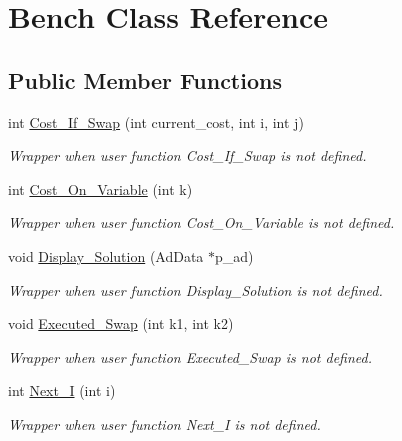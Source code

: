 \hypertarget{classBench}{
\section{Bench Class Reference}
\label{classBench}
}
\subsection*{Public Member Functions}
\begin{DoxyCompactItemize}
\item 
int \hyperlink{classBench_a1dfbb29be43f39a902e8f34a89517999}{Cost\_\-If\_\-Swap} (int current\_\-cost, int i, int j)
\begin{DoxyCompactList}\small\item\em Wrapper when user function Cost\_\-If\_\-Swap is not defined. \item\end{DoxyCompactList}\item 
int \hyperlink{classBench_a822adf748744efa9cf61fdabbce0c02e}{Cost\_\-On\_\-Variable} (int k)
\begin{DoxyCompactList}\small\item\em Wrapper when user function Cost\_\-On\_\-Variable is not defined. \item\end{DoxyCompactList}\item 
void \hyperlink{classBench_aac07a34ac847eb72ed63356853b6fab5}{Display\_\-Solution} (AdData $\ast$p\_\-ad)
\begin{DoxyCompactList}\small\item\em Wrapper when user function Display\_\-Solution is not defined. \item\end{DoxyCompactList}\item 
void \hyperlink{classBench_acfc053cfc8dcad607a543b0c932cec35}{Executed\_\-Swap} (int k1, int k2)
\begin{DoxyCompactList}\small\item\em Wrapper when user function Executed\_\-Swap is not defined. \item\end{DoxyCompactList}\item 
int \hyperlink{classBench_a5d554fbfc64b616467aab8d6d2680ee7}{Next\_\-I} (int i)
\begin{DoxyCompactList}\small\item\em Wrapper when user function Next\_\-I is not defined. \item\end{DoxyCompactList}\item 

\end{DoxyCompactItemize}
